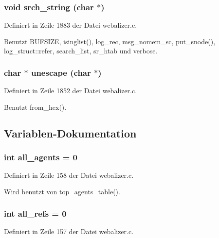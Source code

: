 \subsubsection{\setlength{\rightskip}{0pt plus 5cm}void srch\_\-string (char $\ast$)}\label{webalizer_8c_2b1002ec17d1cd1e6901514b8b6de058}




Definiert in Zeile 1883 der Datei webalizer.c.

Benutzt BUFSIZE, isinglist(), log\_\-rec, msg\_\-nomem\_\-sc, put\_\-snode(), log\_\-struct::refer, search\_\-list, sr\_\-htab und verbose.
\subsubsection{\setlength{\rightskip}{0pt plus 5cm}char $\ast$ unescape (char $\ast$)}\label{webalizer_8c_5d5d55b66d7df3272cf98f061b6fd2f6}




Definiert in Zeile 1852 der Datei webalizer.c.

Benutzt from\_\-hex().

\subsection{Variablen-Dokumentation}
\subsubsection{\setlength{\rightskip}{0pt plus 5cm}int {\bf all\_\-agents} = 0}\label{webalizer_8c_e6a5e084455a29d95c410b6e6f509c07}




Definiert in Zeile 158 der Datei webalizer.c.

Wird benutzt von top\_\-agents\_\-table().
\subsubsection{\setlength{\rightskip}{0pt plus 5cm}int {\bf all\_\-refs} = 0}\label{webalizer_8c_5d9ecc711cb4edb47133e9c8329a2f6a}




Definiert in Zeile 157 der Datei webalizer.c.

